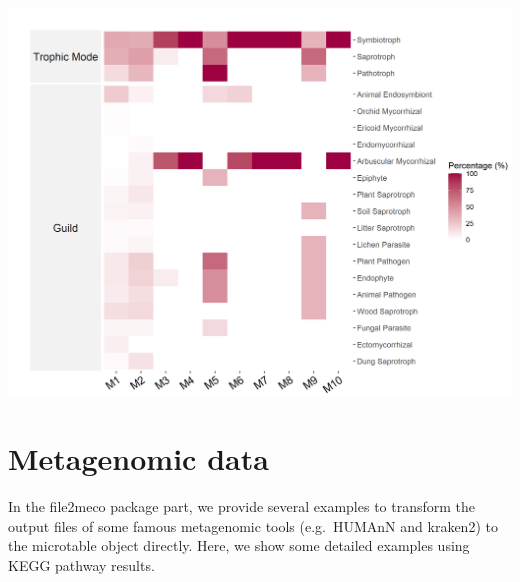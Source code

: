 \documentclass[
]{book}
\newenvironment{Shaded}{\begin{snugshade}}{\end{snugshade}}
\newcommand{\AttributeTok}[1]{\textcolor[rgb]{0.77,0.63,0.00}{#1}}
\newcommand{\CommentTok}[1]{\textcolor[rgb]{0.56,0.35,0.01}{\textit{#1}}}
\newcommand{\ConstantTok}[1]{\textcolor[rgb]{0.00,0.00,0.00}{#1}}
\newcommand{\DecValTok}[1]{\textcolor[rgb]{0.00,0.00,0.81}{#1}}
\newcommand{\FunctionTok}[1]{\textcolor[rgb]{0.00,0.00,0.00}{#1}}
\newcommand{\NormalTok}[1]{#1}
\newcommand{\SpecialCharTok}[1]{\textcolor[rgb]{0.00,0.00,0.00}{#1}}
\newcommand{\StringTok}[1]{\textcolor[rgb]{0.31,0.60,0.02}{#1}}
\begin{document}
\begin{Shaded}
\end{Shaded}

\begin{center}\includegraphics[width=700px]{Images/plot_func_perc_module_fungi} \end{center}

\hypertarget{metagenomic-data}{%
\section{Metagenomic data}\label{metagenomic-data}}

In the file2meco package part,
we provide several examples to transform the output files of some famous metagenomic tools (e.g.~HUMAnN and kraken2) to
the microtable object directly.
Here, we show some detailed examples using KEGG pathway results.
\end{document}
